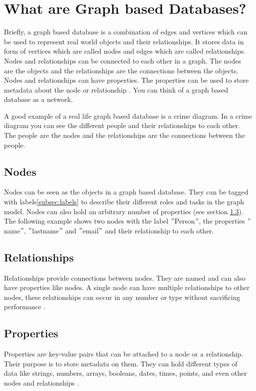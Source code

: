 
\section{What are Graph based Databases?}
Briefly, a graph based database is a combination of edges and vertices which  can be used to represent real world
objects and their relationships.
It stores data in form of vertices which are called nodes and edges which are called relationships.
Nodes and relationships can be connected to each other in a graph.
The nodes are the objects and the relationships are the connections between the objects.
Nodes and relationships can have properties.
The properties can be used to store metadata about the node or relationship \parencite[P. 6f. ]{PractivalNeo4j}.
You can think of a graph based database as a network.

A good example of a real life graph based database is a crime diagram.
In a crime diagram you can see the different people and their relationships to each other.
The people are the nodes and the relationships are the connections between the people. \parencite[compare P. 6f. ]{BeginningNeo4j}

\subsection{Nodes}
Nodes can be seen as the objects in a graph based database.
They can be tagged with labels\ref{subsec:labels} to describe their different roles and tasks in the graph model.
Nodes can also hold an arbitrary number of properties (see section \ref{subsec:properties}).
The following example shows two nodes with the label \("\)Person\("\), the properties \("\)name\("\), \("\)lastname\("\)
and \("\)email\("\) and their relationship to each other\parencite[compare P. 6f.]{PractivalNeo4j}.

\subsection{Relationships}\label{subsec:relationships}
Relationships provide connections between nodes.
They are named and can also have properties like nodes.
A single node can have multiple relationships to other nodes, these relationships can occur in any number or type without
sacrificing performance \parencite[compare]{neo4j:allgemeins}.

\subsection{Properties} \label{subsec:properties}
Properties are key-value pairs that can be attached to a node or a relationship.
Their purpose is to store metadata on them.
They can hold different types of data like strings, numbers, arrays, booleans, dates, times, points, and even other nodes and relationships \parencite[compare ]{neo4j:Values} \parencite[compare]{neo4j:Graph}.

